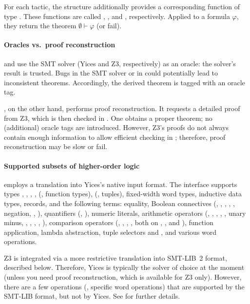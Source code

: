 For each tactic, the  structure additionally provides a
corresponding function of type .  These functions are
called , , and ,
respectively.  Applied to a formula $\varphi$, they return the theorem
$\emptyset \vdash \varphi$ (or fail).

\paragraph{Oracles vs.\ proof reconstruction}

 and  use the SMT solver (Yices and
Z3, respectively) as an oracle: the solver's result is trusted.  Bugs
in the SMT solver or in  could potentially lead to
inconsistent theorems.  Accordingly, the derived theorem is tagged
with an oracle tag.

, on the other hand, performs proof reconstruction.  It
requests a detailed proof from Z3, which is then checked in \HOL{}.
One obtains a proper \HOL{} theorem; no (additional) oracle tags are
introduced. However, Z3's proofs do not always contain enough
information to allow efficient checking in \HOL{}; therefore, proof
reconstruction may be slow or fail.

\paragraph{Supported subsets of higher-order logic}

 employs a translation into Yices's native input
format.  The interface supports types , ,
, , \holtxt{->} (\ie, function types),
 (\ie, tuples), fixed-width word types, inductive data
types, records, and the following terms: equality, Boolean connectives
(, , \holtxt{==>}, \holtxt{/\bs}, \holtxt{\bs /},
negation, , ), quantifiers
(\holtxt{!}, ), numeric literals, arithmetic operators
(, \holtxt{+}, \holtxt{-}, \holtxt{*}, \holtxt{/}, unary
minus, , , , ,
), comparison operators (\holtxt{<}, \holtxt{<=},
\holtxt{>}, \holtxt{>=}, both on , , and
), function application, lambda abstraction, tuple
selectors  and , and various word operations.

Z3 is integrated via a more restrictive translation into SMT-LIB~2
format, described below.  Therefore, Yices is typically the solver of
choice at the moment (unless you need proof reconstruction, which is
available for Z3 only).  However, there are a few operations (\eg,
specific word operations) that are supported by the SMT-LIB format,
but not by Yices.  See  for further details.

